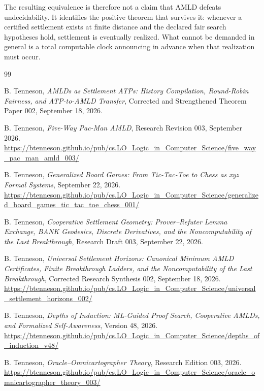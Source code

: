 \documentclass[11pt]{article}
\theoremstyle{remark}
\begin{document}
The resulting equivalence is therefore not a claim that AMLD defeats undecidability.  It identifies the positive theorem that survives it: whenever a certified settlement exists at finite distance and the declared fair search hypotheses hold, settlement is eventually realized.  What cannot be demanded in general is a total computable clock announcing in advance when that realization must occur.

\begin{thebibliography}{99}

B. Tenneson,
\emph{AMLDs as Settlement ATPs: History Compilation, Round-Robin Fairness, and ATP-to-AMLD Transfer},
Corrected and Strengthened Theorem Paper 002, September 18, 2026.

B. Tenneson,
\emph{Five-Way Pac-Man AMLD}, Research Revision 003, September 2026.\\
\url{https://btenneson.github.io/pub/cs.LO_Logic_in_Computer_Science/five_way_pac_man_amld_003/}

B. Tenneson,
\emph{Generalized Board Games: From Tic-Tac-Toe to Chess as xyz Formal Systems}, September 22, 2026.\\
\url{https://btenneson.github.io/pub/cs.LO_Logic_in_Computer_Science/generalized_board_games_tic_tac_toe_chess_001/}

B. Tenneson,
\emph{Cooperative Settlement Geometry: Prover--Refuter Lemma Exchange, BANK Geodesics, Discrete Derivatives, and the Noncomputability of the Last Breakthrough}, Research Draft 003, September 22, 2026.

B. Tenneson,
\emph{Universal Settlement Horizons: Canonical Minimum AMLD Certificates, Finite Breakthrough Ladders, and the Noncomputability of the Last Breakthrough}, Corrected Research Synthesis 002, September 18, 2026.\\
\url{https://btenneson.github.io/pub/cs.LO_Logic_in_Computer_Science/universal_settlement_horizons_002/}

B. Tenneson,
\emph{Depths of Induction: ML-Guided Proof Search, Cooperative AMLDs, and Formalized Self-Awareness}, Version 48, 2026.\\
\url{https://btenneson.github.io/pub/cs.LO_Logic_in_Computer_Science/depths_of_induction_v48/}

B. Tenneson,
\emph{Oracle--Omnicartographer Theory}, Research Edition 003, 2026.\\
\url{https://btenneson.github.io/pub/cs.LO_Logic_in_Computer_Science/oracle_omnicartographer_theory_003/}

\end{thebibliography}
\end{document}
